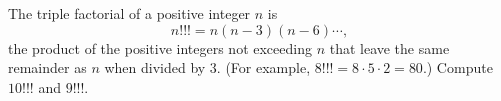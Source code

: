 The triple factorial of a positive integer $n$ is
\[
n!!!=n(n-3)(n-6)\cdots,
\]
the product of the positive integers not exceeding $n$ that leave the same remainder as $n$ when divided by $3$. (For example, $8!!!=8\cdot5\cdot2=80$.) Compute $10!!!$ and $9!!!$.
